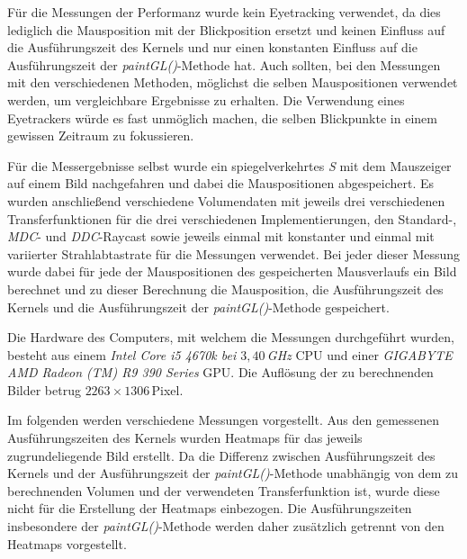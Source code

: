 Für die Messungen der Performanz wurde kein Eyetracking verwendet, da dies lediglich die Mausposition mit der Blickposition ersetzt und keinen Einfluss auf die Ausführungszeit des Kernels und nur einen konstanten Einfluss auf die Ausführungszeit der \emph{paintGL()}-Methode hat.
Auch sollten, bei den Messungen mit den verschiedenen Methoden, möglichst die selben Mauspositionen verwendet werden, um vergleichbare Ergebnisse zu erhalten.
Die Verwendung eines Eyetrackers würde es fast unmöglich machen, die selben Blickpunkte in einem gewissen Zeitraum zu fokussieren.

Für die Messergebnisse selbst wurde ein spiegelverkehrtes \emph{S} mit dem Mauszeiger auf einem Bild nachgefahren und dabei die Mauspositionen abgespeichert.
Es wurden anschließend verschiedene Volumendaten mit jeweils drei verschiedenen Transferfunktionen für die drei verschiedenen Implementierungen, den Standard-, \emph{MDC}- und \emph{DDC}-Raycast sowie jeweils einmal mit konstanter und einmal mit variierter Strahlabtastrate für die Messungen verwendet.
Bei jeder dieser Messung wurde dabei für jede der Mauspositionen des gespeicherten Mausverlaufs ein Bild berechnet und zu dieser Berechnung die Mausposition, die Ausführungszeit des Kernels und die Ausführungszeit der \emph{paintGL()}-Methode gespeichert.

Die Hardware des Computers, mit welchem die Messungen durchgeführt wurden, besteht aus einem \emph{Intel Core i5 4670k bei $3,40$\,GHz} CPU und einer \emph{GIGABYTE AMD Radeon (TM) R9 390 Series} GPU.
Die Auflösung der zu berechnenden Bilder betrug $2263\times1306$\,Pixel.

Im folgenden werden verschiedene Messungen vorgestellt.
Aus den gemessenen Ausführungszeiten des Kernels wurden Heatmaps für das jeweils zugrundeliegende Bild erstellt.
Da die Differenz zwischen Ausführungszeit des Kernels und der Ausführungszeit der \emph{paintGL()}-Methode unabhängig von dem zu berechnenden Volumen und der verwendeten Transferfunktion ist, wurde diese nicht für die Erstellung der Heatmaps einbezogen.
Die Ausführungszeiten insbesondere der \emph{paintGL()}-Methode werden daher zusätzlich getrennt von den Heatmaps vorgestellt.



